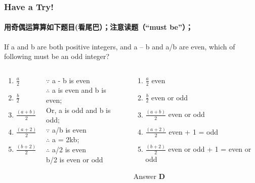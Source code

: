 \documentclass[
	11pt, %
]{beamer}
\begin{document}
\begin{frame}
	\frametitle{Have a Try!}
	\framesubtitle{用奇偶运算算如下题目(看尾巴）；注意读题（“must be”）；}
If a and b are both positive integers, and a – b and a/b are even, which of following must be an odd integer?\\
	\begin{columns}[t] %
		\begin{column}{0.2\textwidth} %
		 \begin{enumerate}[A]
				 \item $\frac{a}{2}$\\
				 \item $\frac{b}{2}$\\
				 \item $\frac{(a + b)}{2}$\\
				 \item $\frac{(a + 2)}{2}$\\
				 \item $\frac{(b + 2)}{2}$\\
      \end{enumerate}
		\end{column}

\begin{column}{0.4\textwidth}
\pause
$\because$ a - b is even \\
$\therefore$ a is even and b is even; \\ 
Or, a is odd and b is odd; \\ 

\bigskip
$\because$ a/b is even \\
 $\therefore$ a = 2kb; \\
$\therefore$ a/2 is even\\
b/2 is even or odd\\
\end{column}

\begin{column}{0.4\textwidth} %
		\pause 
	 \begin{enumerate}[A]
		 \item $\frac{a}{2}$ even
		 \item $\frac{b}{2}$ even or odd
		 \item $\frac{(a + b)}{2}$ even or odd
		 \item $\frac{(a + 2)}{2}$ even + 1 = odd
		 \item $\frac{(b + 2)}{2}$ even or odd + 1 = even or odd
  \end{enumerate}

\bigskip
Answer \textbf{D}
\end{column}
\end{columns}

\end{frame}
\end{document}
